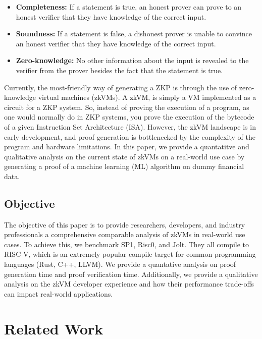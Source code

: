 \documentclass{scrartcl}
\begin{document}
\begin{itemize}
	\item \textbf{Completeness:} If a statement is true, an honest prover can prove to an honest verifier that they have knowledge of the correct input.
	\item \textbf{Soundness:} If a statement is false, a dishonest prover is unable to convince an honest verifier that they have knowledge of the correct input.
	\item \textbf{Zero-knowledge:} No other information about the input is revealed to the verifier from the prover besides the fact that the statement is true.
\end{itemize}

Currently, the most-friendly way of generating a ZKP is through the use of zero-knowledge virtual machines (zkVMs). A zkVM, is simply a VM implemented as a circuit for a ZKP system. So, instead of proving the execution of a program, as one would normally do in ZKP systems, you prove the execution of the bytecode of a given Instruction Set Architecture (ISA). However, the zkVM landscape is in early development, and proof generation is bottlenecked by the complexity of the program and hardware limitations. In this paper, we provide a quantatitve and qualitative analysis on the current state of zkVMs on a real-world use case by generating a proof of a machine learning (ML) algorithm on dummy financial data.

\subsection{Objective}

The objective of this paper is to provide researchers, developers, and industry professionals a comprehensive comparable analysis of zkVMs in real-world use cases. To achieve this, we benchmark SP1\cite{Roy2024}, Risc0\cite{bruestle2023risc}, and Jolt\cite{arun2024jolt}. They all compile to RISC-V, which is an extremely popular compile target for common programming languages (Rust, C++, LLVM). We provide a quantative analysis on proof generation time and proof verification time. Additionally, we provide a qualitative analysis on the zkVM developer experience and how their performance trade-offs can impact real-world applications.

\section{Related Work}
\end{document}

